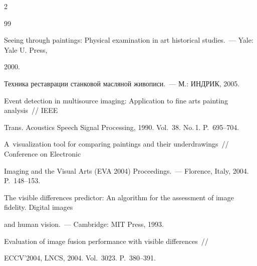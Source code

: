 \begin{multicols}{2}
{{\begin{thebibliography}{99}


Seeing through paintings: Physical examination in art historical studies.~--- Yale: Yale U. Press, 


2000.









Техника реставрации станковой масляной живописи.~--- М.: ИНДРИК, 2005.









Event detection in multisource imaging: Application to fine arts painting analysis~// IEEE 


Trans. Acoustics Speech Signal Processing, 1990. Vol.~38. No.\,1. P.~695--704.









A~visualization tool for comparing paintings and their underdrawings~// Conference on Electronic 


Imaging and the Visual Arts (EVA 2004) Proceedings.~--- Florence, Italy, 2004. P.~148--153.









 The visible differences predictor: An algorithm for the assessment of image fidelity. Digital images 


and human vision.~--- Cambridge: MIT Press, 1993.







 Evaluation of image fusion performance with visible differences~// 


ECCV'2004, LNCS, 2004. Vol.~3023. P.~380--391.










\end{thebibliography}}}
\end{multicols}
